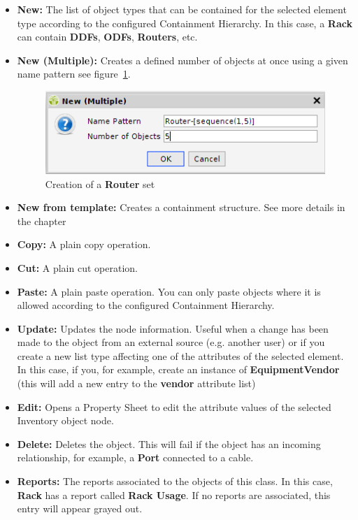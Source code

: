 \documentclass[a4paper]{article}
\begin{document}
	\begin{itemize}
		\item \textbf{New:} The list of object types that can be contained for the selected element type according to the configured Containment Hierarchy. In this case, a \textbf{Rack} can contain \textbf{DDFs}, \textbf{ODFs}, \textbf{Routers}, etc.
		\item \textbf{New (Multiple):} Creates a defined number of objects at once using a given name pattern see \textbf{} figure~\ref{fig:new_multiple}.
			\begin{figure}[h!]
				\centering
				\includegraphics[width=0.5\linewidth]{img/new_multiple.png}
				\caption{Creation of a \textbf{Router} set}
				\label{fig:new_multiple}
			\end{figure}
		\item \textbf{New from template:} Creates a containment structure. See more details in the chapter 
		\item \textbf{Copy:} A plain copy operation.
		\item \textbf{Cut:} A plain cut operation.
		\item \textbf{Paste:} A plain paste operation. You can only paste objects where it is allowed according to the configured Containment Hierarchy.
		\item \textbf{Update:} Updates the node information. Useful when a change has been made to the object from an external source (e.g. another user) or if you create a new list type affecting one of the attributes of the selected element. In this case, if you, for example, create an instance of \textbf{EquipmentVendor} (this will add a new entry to the \textbf{vendor} attribute list)
		\item \textbf{Edit:} Opens a Property Sheet to edit the attribute values of the selected Inventory object node.
		\item \textbf{Delete:} Deletes the object. This will fail if the object has an incoming relationship, for example, a \textbf{Port} connected to a cable.
		\item \textbf{Reports:} The reports associated to the objects of this class. In this case, \textbf{Rack} has a report called \textbf{Rack Usage}. If no reports are associated, this entry will appear grayed out.

\end{itemize}
\end{document}
